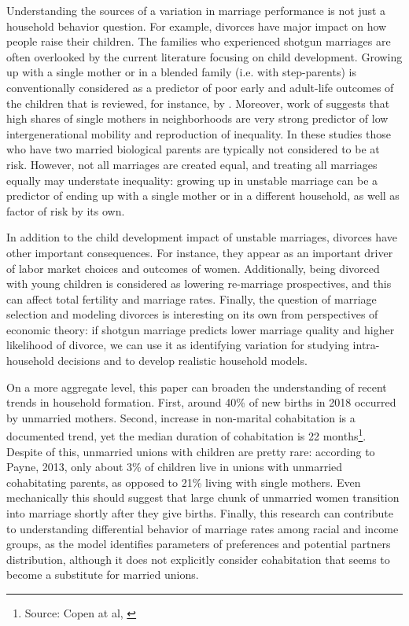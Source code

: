 \documentclass[12pt,letter]{article}
\begin{document}
Understanding the sources of a variation in marriage performance is not just a household behavior question. For example, divorces have major impact on how people raise their children. The families who experienced shotgun marriages are often overlooked by the current literature focusing on child development. Growing up with a single mother or in a blended family (i.e. with step-parents) is conventionally considered as a predictor of poor early and adult-life outcomes of the children that is reviewed, for instance, by \cite{kearney}. Moreover, work of \cite{chetty} suggests that high shares of single mothers in neighborhoods are very strong predictor of low intergenerational mobility and reproduction of inequality. In these studies those who have two married biological parents are typically not considered to be at risk. However, not all marriages are created equal, and treating all marriages equally may understate inequality: growing up in unstable marriage can be a predictor of ending up with a single mother or in a different household, as well as factor of risk by its own.

In addition to the child development impact of unstable marriages, divorces have other important consequences. For instance, they appear as an important driver of labor market choices and outcomes of women. Additionally, being divorced with young children is considered as lowering re-marriage prospectives, and this can affect total fertility and marriage rates. Finally, the question of marriage selection and modeling divorces is interesting on its own from perspectives of economic theory: if shotgun marriage predicts lower marriage quality and higher likelihood of divorce, we can use it as identifying variation for studying intra-household decisions and to develop realistic household models.

On a more aggregate level, this paper can broaden the understanding of recent trends in household formation. First, around 40\% of new births in 2018 occurred by unmarried mothers. Second, increase in non-marital cohabitation is a documented trend, yet the median duration of cohabitation is 22 months\footnote{Source: Copen at al,  \cite{copen}}. Despite of this, unmarried unions with children are pretty rare: according to Payne, 2013\nocite{payne}, only about 3\% of children live in unions with unmarried cohabitating parents, as opposed to 21\% living with single mothers. Even mechanically this should suggest that large chunk of unmarried women transition into marriage shortly after they give births. Finally, this research can contribute to understanding differential behavior of marriage rates among racial and income groups, as the model identifies parameters of preferences and potential partners distribution, although it does not explicitly consider cohabitation that seems to become a substitute for married unions.
\end{document}
